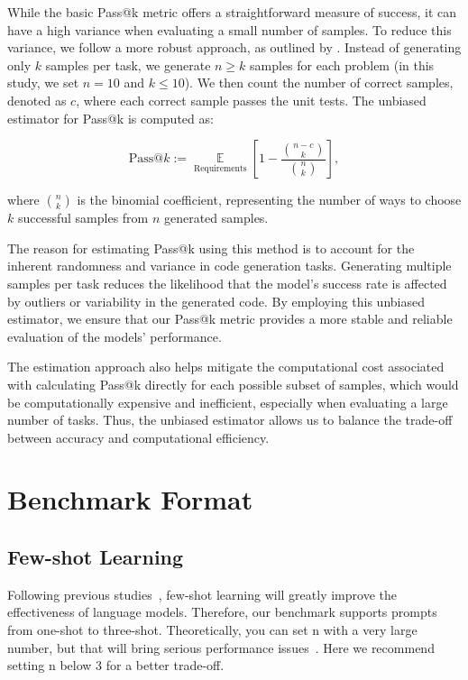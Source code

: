 While the basic Pass@k metric offers a straightforward measure of success, it can have a high variance when evaluating a small number of samples. To reduce this variance, we follow a more robust approach, as outlined by \citet{kulal2019spoc}. Instead of generating only \( k \) samples per task, we generate \( n \geq k \) samples for each problem (in this study, we set \( n = 10 \) and \( k \leq 10 \)). We then count the number of correct samples, denoted as \( c \), where each correct sample passes the unit tests. The unbiased estimator for Pass@k is computed as:

\begin{equation}
\text{Pass@}k := \mathop{\mathbb{E}}\limits_{\text{Requirements}} \left[ 1 - \frac{\binom{n-c}{k}}{\binom{n}{k}} \right],
\end{equation}

where \( \binom{n}{k} \) is the binomial coefficient, representing the number of ways to choose \( k \) successful samples from \( n \) generated samples.

The reason for estimating Pass@k using this method is to account for the inherent randomness and variance in code generation tasks. Generating multiple samples per task reduces the likelihood that the model's success rate is affected by outliers or variability in the generated code. By employing this unbiased estimator, we ensure that our Pass@k metric provides a more stable and reliable evaluation of the models' performance.

The estimation approach also helps mitigate the computational cost associated with calculating Pass@k directly for each possible subset of samples, which would be computationally expensive and inefficient, especially when evaluating a large number of tasks. Thus, the unbiased estimator allows us to balance the trade-off between accuracy and computational efficiency.


\section{Benchmark Format}
\label{sec:prompt}
\subsection{Few-shot Learning}
Following previous studies~\cite{brown2020language}, few-shot learning will greatly improve the effectiveness of language models. 
Therefore, our benchmark supports prompts from one-shot to three-shot.
Theoretically, you can set n with a very large number, but that will bring serious performance issues~\cite{vaswani2017attention}. 
Here we recommend setting n below 3 for a better trade-off.


